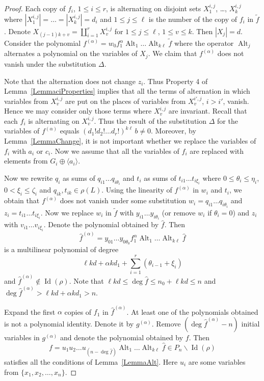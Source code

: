 \documentclass[12pt, reqno, a4paper]{amsart}
\theoremstyle{plain}
\theoremstyle{remark}
\theoremstyle{definition}
\begin{document}
\begin{proof}
Each copy of $f_i$, $1\leqslant i \leqslant r$,
is alternating on disjoint sets $X^{i,j}_1$, \ldots, $X^{i,j}_k$
where $|X^{i,j}_1|=\ldots = |X^{i,j}_k| = d_i$
and $1 \leqslant j \leqslant \ell$ is the number of the copy of $f_i$ in $\tilde f$.
Denote $X_{(j-1)k+v} = \coprod_{i=1}^r X^{i,j}_v$ for
$1 \leqslant j \leqslant \ell$, $1 \leqslant v \leqslant k$.
Then $|X_j|=d$.
Consider the polynomial $ f^{(\alpha)} =
w_0 f_1^{\alpha}  \operatorname{Alt}_1 \ldots \operatorname{Alt}_{k\ell} \tilde f$
where the operator $\operatorname{Alt}_j$ alternates a polynomial on the variables of $X_j$.
We claim that $f^{(\alpha)}$ does not vanish
under the substitution $\Delta$.

Note that the alternation
does not change $z_i$. Thus Property 4 of Lemma~\ref{LemmaciProperties}
implies that all the terms of alternation
in which variables from $X^{i,j}_v$ are put on the places of
variables from $X^{i',j}_{v}$, $i > i'$, vanish.
Hence we may consider only those
terms where $X^{i,j}_v$ are invariant.
Recall that each $f_i$ is alternating on $X^{i,j}_v$.
Thus the result of the substitution
$\Delta$ for the variables of $f^{(\alpha)}$ equals
$(d_1!d_2! \ldots d_r!)^{k\ell}\, b \ne 0$.
Moreover, by Lemma~\ref{LemmaChange},
it is not important whether we replace the variables of $f_i$ with $a_i$ or $c_i$.
Now we assume that all the variables of $f_i$ are replaced with elements from
$G_i\oplus\langle a_i\rangle$.

Now we rewrite $q_i$ as sums of $q_{i1} \ldots q_{i\theta_i}$
and  $t_i$ as sums of $t_{i1} \ldots t_{i\xi_i}$ where $0 \leqslant \theta_i \leqslant \eta_i$, $0 < \xi_i \leqslant \zeta_i$ and  $q_{ik}, t_{ik}\in\rho(L)$.
Using the linearity of $f^{(\alpha)}$ in $w_i$ and $t_i$, we obtain
that $f^{(\alpha)}$ does not vanish under some substitution
$w_i=q_{i1} \ldots q_{i\theta_i}$ and $z_i=t_{i1} \ldots t_{i\xi_i}$.
Now we replace $w_i$ in $\tilde f$ with $y_{i1} \ldots y_{i\theta_i}$
(or remove $w_i$ if $\theta_i = 0$)
and $z_i$ with $v_{i1} \ldots v_{i\xi_i}$.
Denote the polynomial obtained by $\hat f$.
Then $$\hat f^{(\alpha)} = y_{01}\ldots y_{0\theta_0}
f_1^\alpha \operatorname{Alt}_1 \ldots \operatorname{Alt}_{k\ell} \hat f$$ is a multilinear polynomial of degree
$$\ell k d + \alpha k d_1 +\sum_{i=1}^r (\theta_{i-1} + \xi_i)$$
and $\hat f^{(\alpha)} \notin \operatorname{Id}(\rho)$.
Note that $\ell k d \leqslant \deg \hat f \leqslant n_0 + \ell k d \leqslant n$
and $\deg \hat f^{(\alpha)}  > \ell k d + \alpha k d_1 > n$.

Expand the first $\alpha$ copies of $f_1$ in $\hat f^{(\alpha)}$.
At least one of the polynomials obtained is not a polynomial identity. Denote it by
$g^{(\alpha)}$.
Remove $\left(\deg \hat f^{(\alpha)}-n\right)$ initial variables in $g^{(\alpha)}$
and denote the polynomial obtained by $f$.
Then
$$f = u_1 u_2 \ldots u_{\left(n-\deg \hat f\right)} \operatorname{Alt}_1 \ldots \operatorname{Alt}_{k\ell} \hat f
\in P_n \backslash \operatorname{Id}(\rho)$$
satisfies all the conditions of Lemma~\ref{LemmaAlt}.
Here $u_i$ are some variables from $\lbrace x_1, x_2, \ldots, x_n \rbrace$.
\end{proof}
\end{document}
